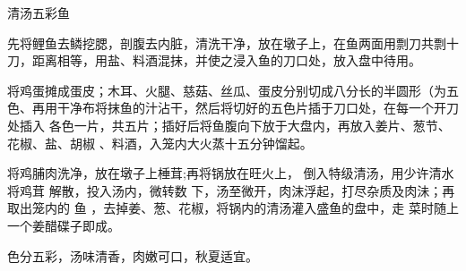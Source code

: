 \begin{recipe}[麒麟鱼]{清汤五彩鱼}

\ingredients


\preparation

\step 先将鲤鱼去鳞挖腮，剖腹去内脏，清洗干净，放在墩子上，在鱼两面用剽刀共剽十
刀，距离相等，用盐、料酒混抹，并使之浸入鱼的刀口处，放入盘中待用。

\step 将鸡蛋摊成蛋皮；木耳、火腿、慈菇、丝瓜、蛋皮分别切成八分长的半圆形（为五
色、再用干净布将抹鱼的汁沾干，然后将切好的五色片插于刀口处，在每一个开刀处插入
各色一片，共五片；插好后将鱼腹向下放于大盘内，再放入姜片、葱节、花椒、盐、胡椒
、料酒，入笼内大火蒸十五分钟馏起。

将鸡脯肉洗净，放在墩子上棰茸;再将锅放在旺火上， 倒入特级清汤，用少许清水将鸡茸
解散，投入汤内，微转数 下，汤至微开，肉沫浮起，打尽杂质及肉沬；再取出笼内的 鱼
，去掉姜、葱、花椒，将锅内的清汤灌入盛鱼的盘中，走 菜时随上一个姜醋碟子即成。

\features

色分五彩，汤味清香，肉嫩可口，秋夏适宜。

\end{recipe}

